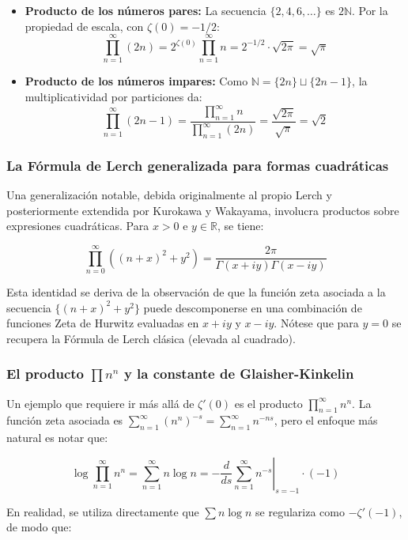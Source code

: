 \begin{itemize}
    \item \textbf{Producto de los números pares:} La secuencia $\{2, 4, 6, \dots\}$ es $2\mathbb{N}$. Por la propiedad de escala, con $\zeta(0) = -1/2$:
    $$ \prod_{n=1}^{\infty} (2n) = 2^{\zeta(0)} \prod_{n=1}^{\infty} n = 2^{-1/2} \cdot \sqrt{2\pi} = \sqrt{\pi} $$
    
    \item \textbf{Producto de los números impares:} Como $\mathbb{N} = \{2n\} \sqcup \{2n-1\}$, la multiplicatividad por particiones da:
    $$ \prod_{n=1}^{\infty} (2n-1) = \frac{\prod_{n=1}^{\infty} n}{\prod_{n=1}^{\infty} (2n)} = \frac{\sqrt{2\pi}}{\sqrt{\pi}} = \sqrt{2} $$
\end{itemize}

\subsubsection{La Fórmula de Lerch generalizada para formas cuadráticas}

Una generalización notable, debida originalmente al propio Lerch y posteriormente extendida por Kurokawa y Wakayama, involucra productos sobre expresiones cuadráticas. Para $x > 0$ e $y \in \mathbb{R}$, se tiene:

$$ \prod_{n=0}^{\infty} \left((n+x)^2 + y^2\right) = \frac{2\pi}{\Gamma(x+iy)\Gamma(x-iy)} $$

Esta identidad se deriva de la observación de que la función zeta asociada a la secuencia $\{(n+x)^2 + y^2\}$ puede descomponerse en una combinación de funciones Zeta de Hurwitz evaluadas en $x+iy$ y $x-iy$. Nótese que para $y=0$ se recupera la Fórmula de Lerch clásica (elevada al cuadrado).

\subsubsection{El producto $\prod n^n$ y la constante de Glaisher-Kinkelin}

Un ejemplo que requiere ir más allá de $\zeta'(0)$ es el producto $\prod_{n=1}^{\infty} n^n$. La función zeta asociada es $\sum_{n=1}^{\infty} (n^n)^{-s} = \sum_{n=1}^{\infty} n^{-ns}$, pero el enfoque más natural es notar que:

$$ \log \prod_{n=1}^{\infty} n^n = \sum_{n=1}^{\infty} n \log n = -\left.\frac{d}{ds}\sum_{n=1}^{\infty} n^{-s}\right|_{s=-1} \cdot (-1) $$

En realidad, se utiliza directamente que $\sum n \log n$ se regulariza como $-\zeta'(-1)$, de modo que:

